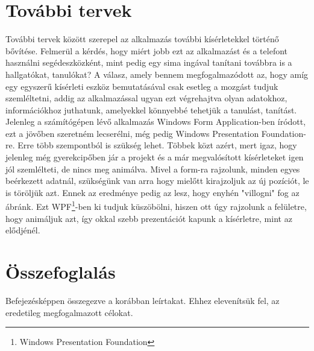 \documentclass{thesis-ekf}
\theoremstyle{definition}
\theoremstyle{remark}
\begin{document}
\chapter{További tervek}
További tervek között szerepel az alkalmazás további kísérletekkel történő bővítése. Felmerül a kérdés, hogy miért jobb ezt az alkalmazást és a telefont használni segédeszközként, mint pedig egy sima ingával tanítani továbbra is a hallgatókat, tanulókat? A válasz, amely bennem megfogalmazódott az, hogy amíg egy egyszerű kísérleti eszköz bemutatásával csak esetleg a mozgást tudjuk szemléltetni, addig az alkalmazással ugyan ezt végrehajtva olyan adatokhoz, információkhoz juthatunk, amelyekkel könnyebbé tehetjük a tanulást, tanítást.
Jelenleg a számítógépen lévő alkalmazás Windows Form Application-ben íródott, ezt a jövőben szeretném lecserélni, még pedig Windows Presentation Foundation-re. Erre több szempontból is szükség lehet. Többek közt azért, mert igaz, hogy jelenleg még gyerekcipőben jár a projekt és a már megvalósított kísérleteket igen jól szemlélteti, de nincs meg animálva. Mivel a form-ra rajzolunk, minden egyes beérkezett adatnál, szükségünk van arra hogy mielőtt kirajzoljuk az új pozíciót, le is töröljük azt. Ennek az eredménye pedig az lesz, hogy enyhén "villogni" fog az ábránk. Ezt WPF\footnote{Windows Presentation Foundation}-ben ki tudjuk küszöbölni, hiszen ott úgy rajzolunk a felületre, hogy animáljuk azt, így okkal szebb prezentációt kapunk a kísérletre, mint az elődjénél.

\chapter{Összefoglalás}
Befejezésképpen összegezve a korábban leírtakat. Ehhez elevenítsük fel, az eredetileg megfogalmazott célokat.
\end{document}
